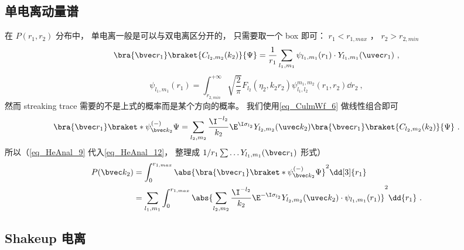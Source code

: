 \subsection{单电离动量谱}
在 $P(r_1, r_2)$ 分布中， 单电离一般是可以与双电离区分开的， 只需要取一个 box 即可： $r_1 < r_{1,max}$ ， $r_2 > r_{2,min}$
\begin{equation}\label{eq_HeAnal_9}
\bra{\bvec r_1}\braket{C_{l_2,m_2}(k_2)}{\Psi} = \frac{1}{r_1} \sum_{l_1, m_1} \psi_{l_1,m_1}(r_1) \cdot Y_{l_1, m_1}(\uvec r_1)~,
\end{equation}
\begin{equation}
\psi_{l_1,m_1}(r_1) = \int_{r_{2,min}}^{+\infty} \sqrt{\frac{2}{\pi}}F_{l_2}(\eta_2, k_2 r_2)\psi_{l_1, l_2}^{m_1, m_2}(r_1, r_2)\dd{r_2}~,
\end{equation}
然而 streaking trace 需要的不是上式的概率而是某个方向的概率。 我们使用\autoref{eq_CulmWf_6}  做线性组合即可
\begin{equation}\label{eq_HeAnal_12}
\bra{\bvec r_1}\braket*{\psi_{\bvec k_2}^{(-)}}{\Psi} = \sum_{l_2,m_2} \frac{\I^{-l_2}}{k_2} \E^{\I\sigma_{l_2}}Y_{l_2,m_2}(\uvec k_2) \bra{\bvec r_1}\braket{C_{l_2,m_2}(k_2)}{\Psi}~.
\end{equation}
所以（\autoref{eq_HeAnal_9} 代入\autoref{eq_HeAnal_12}， 整理成 $1/r_1\sum \dots Y_{l_1,m_1}(\bvec r_1)$ 形式）
\begin{equation}\label{eq_HeAnal_11}
\begin{aligned}
P(\bvec k_2) &= \int_0^{r_{1,max}} \abs{\bra{\bvec r_1}\braket*{\psi_{\bvec k_2}^{(-)}}{\Psi}}^2 \dd[3]{r_1}\\
&= \sum_{l_1,m_1} \int_0^{r_{1,max}} \abs{\sum_{l_2,m_2} \frac{\I^{-l_2}}{k_2} \E^{-\I \sigma_{l_2}} Y_{l_2,m_2}(\uvec k_2) \cdot \psi_{l_1,m_1}(r_1)}^2 \dd{r_1}~.
\end{aligned}
\end{equation}

\subsection{Shakeup 电离}


